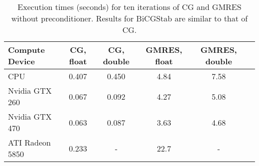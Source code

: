 \begin{table}[tb]
\begin{center}
\begin{tabular}{l|c| c|c| c|c|}
Compute Device & CG, float & CG, double & GMRES, float & GMRES, double \\
\hline
CPU             & 0.407 & 0.450 & 4.84 & 7.58 \\
Nvidia GTX 260  & 0.067 & 0.092 & 4.27 & 5.08 \\
Nvidia GTX 470  & 0.063 & 0.087 & 3.63 & 4.68 \\
ATI Radeon 5850 & 0.233 & -     & 22.7 & -\\
\end{tabular}
\caption{Execution times (seconds) for ten iterations of CG and GMRES without preconditioner. Results for BiCGStab are similar to that of CG.}
\label{tab:solverbench}
\end{center}
\end{table}

